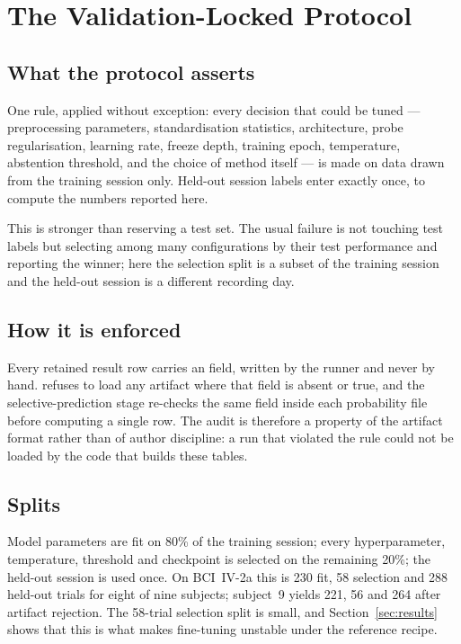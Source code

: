 \section{The Validation-Locked Protocol}
\label{sec:protocol}

\subsection{What the protocol asserts}
One rule, applied without exception: every decision that could be tuned ---
preprocessing parameters, standardisation statistics, architecture, probe
regularisation, learning rate, freeze depth, training epoch, temperature,
abstention threshold, and the choice of method itself --- is made on data drawn
from the training session only. Held-out session labels enter exactly once, to
compute the numbers reported here.

This is stronger than reserving a test set. The usual failure is not touching
test labels but selecting among many configurations by their test performance
and reporting the winner; here the selection split is a subset of the training
session and the held-out session is a different recording day.

\subsection{How it is enforced}
Every retained result row carries an 
field, written by the runner and never by hand.
 refuses to load any artifact where that field
is absent or true, and the selective-prediction stage re-checks the same field
inside each probability file before computing a single row. The audit is
therefore a property of the artifact format rather than of author discipline: a
run that violated the rule could not be loaded by the code that builds these
tables.

\subsection{Splits}
Model parameters are fit on 80\% of the training session; every hyperparameter,
temperature, threshold and checkpoint is selected on the remaining 20\%; the
held-out session is used once. On BCI~IV-2a this is 230 fit, 58 selection and 288
held-out trials for eight of nine subjects; subject~9 yields 221, 56 and 264
after artifact rejection. The 58-trial selection split is small, and
Section~\ref{sec:results} shows that this is what makes fine-tuning unstable
under the reference recipe.

